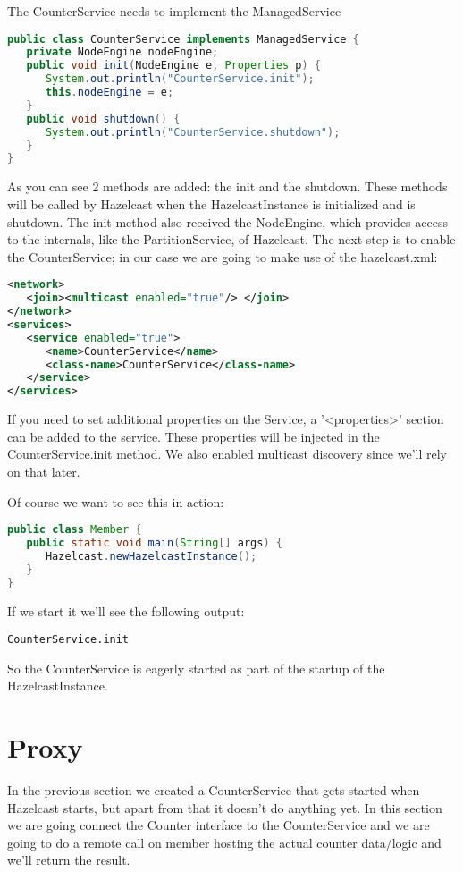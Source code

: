 The CounterService needs to implement the ManagedService
\begin{lstlisting}[language=java]
public class CounterService implements ManagedService {
   private NodeEngine nodeEngine;
   public void init(NodeEngine e, Properties p) {
      System.out.println("CounterService.init");
      this.nodeEngine = e;
   }
   public void shutdown() {
      System.out.println("CounterService.shutdown");
   }
}
\end{lstlisting}
As you can see 2 methods are added: the init and the shutdown. These methods will be called by Hazelcast when the HazelcastInstance is initialized and is shutdown. The init method also received the NodeEngine, which provides access to the internals, like the PartitionService, of Hazelcast. The next step is to enable the CounterService; in our case we are going to make use of the hazelcast.xml:
\begin{lstlisting}[language=xml]
<network>
   <join><multicast enabled="true"/> </join>
</network>
<services>
   <service enabled="true">
      <name>CounterService</name>
      <class-name>CounterService</class-name>
   </service>
</services>
\end{lstlisting}
If you need to set additional properties on the Service, a '<properties>' section can be added to the service. These properties will be injected in the CounterService.init method. We also enabled multicast discovery since we'll rely on that later.

Of course we want to see this in action:
\begin{lstlisting}[language=java]
public class Member {
   public static void main(String[] args) {
      Hazelcast.newHazelcastInstance();
   }
}
\end{lstlisting}
If we start it we'll see the following output:
\begin{lstlisting}
CounterService.init
\end{lstlisting}
So the CounterService is eagerly started as part of the startup of the HazelcastInstance.

\section{Proxy}
In the previous section we created a CounterService that gets started when Hazelcast starts, but apart from that it doesn't do anything yet. In this section we are going connect the Counter interface to the CounterService and we are going to do a remote call on member hosting the actual counter data/logic and we'll return the result.

